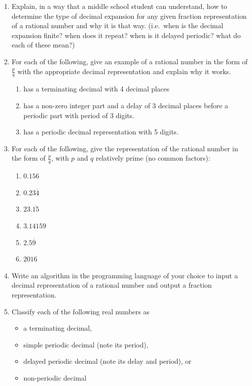 \documentclass[
]{book}
\providecommand{\tightlist}{%
  \setlength{\itemsep}{0pt}\setlength{\parskip}{0pt}}
\theoremstyle{definition}
\theoremstyle{definition}
\theoremstyle{definition}
\theoremstyle{definition}
\theoremstyle{remark}
\begin{document}
\begin{enumerate}
\def\labelenumi{\arabic{enumi}.}
\item
  Explain, in a way that a middle school student can understand, how to determine the type of decimal expansion for any given fraction representation of a rational number and why it is that way. (i.e.~when is the decimal expansion finite? when does it repeat? when is it delayed periodic? what do each of these mean?)
\item
  For each of the following, give an example of a rational number in the form of \(\frac{p}{q}\) with the appropriate decimal representation and explain why it works.

  \begin{enumerate}
  \def\labelenumii{\alph{enumii}.}
  \tightlist
  \item
    has a terminating decimal with 4 decimal places
  \item
    has a non-zero integer part and a delay of 3 decimal places before a periodic part with period of 3 digits.
  \item
    has a periodic decimal representation with 5 digits.
  \end{enumerate}
\item
  For each of the following, give the representation of the rational number in the form of \(\frac{p}{q}\), with \(p\) and \(q\) relatively prime (no common factors):

  \begin{enumerate}
  \def\labelenumii{\alph{enumii}.}
  \tightlist
  \item
    \(0.156\)
  \item
    \(0.23\overline{4}\)
  \item
    \(23.\overline{15}\)
  \item
    \(3.14159\)
  \item
    \(2.5\overline{9}\)
  \item
    \(2016\)
  \end{enumerate}
\item
  Write an algorithm in the programming language of your choice to input a decimal representation of a rational number and output a fraction representation.
\item
  Classify each of the following real numbers as

  \begin{itemize}
  \tightlist
  \item
    a terminating decimal,
  \item
    simple periodic decimal (note its period),
  \item
    delayed periodic decimal (note its delay and period), or
  \item
    non-periodic decimal
  \end{itemize}


\end{enumerate}
\end{document}

